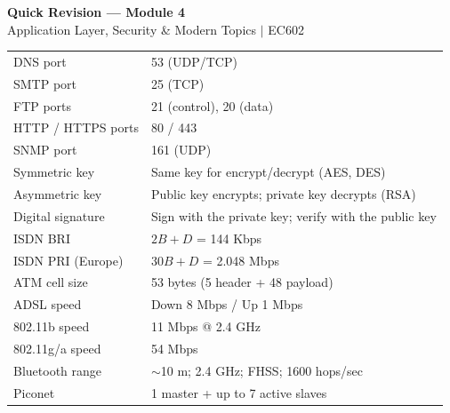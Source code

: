 \documentclass[12pt,a4paper]{article}
\begin{document}
\newpage
\begin{center}
  {\large\bfseries\color{myred} Quick Revision --- Module 4}\\[3pt]
  {\small\color{mydark} Application Layer, Security \& Modern Topics $|$ EC602}
\end{center}
\noindent{\color{myred}\rule{\linewidth}{1.2pt}}
\vspace{4pt}

\begin{tcolorbox}[formulabox, title={\textbf{Key Facts at a Glance}}]
\begin{tabularx}{\linewidth}{B{5.0cm} X}
DNS port            & 53 (UDP/TCP) \\[2pt]
SMTP port           & 25 (TCP) \\[2pt]
FTP ports           & 21 (control), 20 (data) \\[2pt]
HTTP / HTTPS ports  & 80 / 443 \\[2pt]
SNMP port           & 161 (UDP) \\[2pt]
Symmetric key       & Same key for encrypt/decrypt (AES, DES) \\[2pt]
Asymmetric key      & Public key encrypts; private key decrypts (RSA) \\[2pt]
Digital signature   & Sign with the private key; verify with the public key \\[2pt]
ISDN BRI            & $2B + D$ = 144 Kbps \\[2pt]
ISDN PRI (Europe)   & $30B + D$ = 2.048 Mbps \\[2pt]
ATM cell size       & 53 bytes (5 header + 48 payload) \\[2pt]
ADSL speed          & Down 8 Mbps / Up 1 Mbps \\[2pt]
802.11b speed       & 11 Mbps @ 2.4 GHz \\[2pt]
802.11g/a speed     & 54 Mbps \\[2pt]
Bluetooth range     & $\sim$10 m; 2.4 GHz; FHSS; 1600 hops/sec \\[2pt]
Piconet             & 1 master + up to 7 active slaves \\[2pt]
\end{tabularx}
\end{tcolorbox}

\vspace{6pt}
\end{document}
